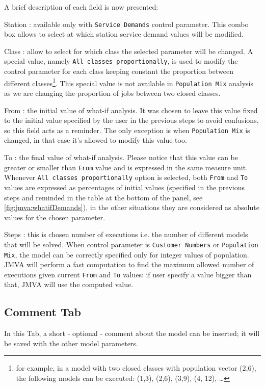 A brief description of each field is now presented:
\begin{description*}
\item[Station :] available only with \texttt{Service Demands} control
parameter. This combo box allows to select at which station service
demand values will be modified.
\item[Class :] allow to select for which class the selected
parameter will be changed. A special value, namely \texttt{All
classes proportionally}, is used to modify the control parameter for
each class keeping constant the proportion between different
classes\footnote{for example, in a model with two closed classes
with population vector (2,6), the following models can be executed:
(1,3), (2,6), (3,9), (4, 12), \dots}. This special value is not
available in \texttt{Population Mix} analysis as we are changing the
proportion of jobs between two closed classes.
\item[From :] the initial value of what-if analysis. It was chosen
to leave this value fixed to the initial value specified by the user
in the previous steps to avoid confusions, so this field acts as a
reminder. The only exception is when \texttt{Population Mix} is
changed, in that case it's allowed to modify this value too.
\item[To :] the final value of what-if analysis. Please notice that
this value can be greater or smaller than \texttt{From} value and is
expressed in the same measure unit. Whenever \texttt{All classes
proportionally} option is selected, both \texttt{From} and
\texttt{To} values are expressed as percentages of initial values
(specified in the previous steps and reminded in the table at the
bottom of the panel, see \autoref{fig:jmva:whatifDemands}), in the
other situations they are considered as absolute values for the
chosen parameter.
\item[Steps :] this is chosen number of executions i.e. the number
of different models that will be solved. When control parameter is
\texttt{Customer Numbers} or \texttt{Population Mix}, the model can
be correctly specified only for integer values of population. JMVA
will perform a fast computation to find the maximum allowed number
of executions given current \texttt{From} and \texttt{To} values: if
user specify a value bigger than that, JMVA will use the computed
value.
\end{description*}


\subsection{Comment Tab}
In this Tab, a short - optional - comment about the model can be
inserted; it will be saved with the other model parameters.

